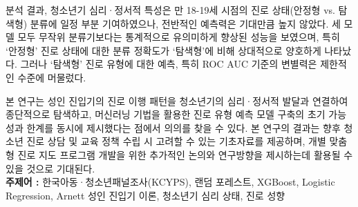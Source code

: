\begin{center}
  분석 결과, 청소년기 심리·정서적 특성은 만 18-19세 시점의 진로 상태(안정형 vs. 탐색형) 분류에 일정 부분 기여하였으나, 전반적인 예측력은 기대만큼 높지 않았다. 세 모델 모두 무작위 분류기보다는 통계적으로 유의미하게 향상된 성능을 보였으며, 특히 ‘안정형’ 진로 상태에 대한 분류 정확도가 ‘탐색형’에 비해 상대적으로 양호하게 나타났다. 그러나 ‘탐색형’ 진로 유형에 대한 예측, 특히 ROC AUC 기준의 변별력은 제한적인 수준에 머물렀다.

  본 연구는 성인 진입기의 진로 이행 패턴을 청소년기의 심리·정서적 발달과 연결하여 종단적으로 탐색하고, 머신러닝 기법을 활용한 진로 유형 예측 모델 구축의 초기 가능성과 한계를 동시에 제시했다는 점에서 의의를 찾을 수 있다.
  본 연구의 결과는 향후 청소년 진로 상담 및 교육 정책 수립 시 고려할 수 있는 기초자료를 제공하며, 개별 맞춤형 진로 지도 프로그램 개발을 위한 추가적인 논의와 연구방향을 제시하는데 활용될 수 있을 것으로 기대된다.
  \vspace{0.5em}
  \\
  \noindent\textbf{주제어 :} 한국아동·청소년패널조사(KCYPS), 랜덤 포레스트, XGBoost, Logistic Regression, Arnett 성인 진입기 이론, 청소년기 심리 상태, 진로 성향

  \vspace{1em}

\end{center}
